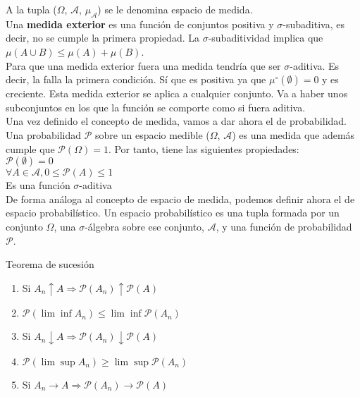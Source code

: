 A la tupla ($\Omega$, $\mathcal{A}$, $\mu_{\mathcal{A}}$) se le denomina espacio de medida.\\

Una \textbf{medida exterior} es una función de conjuntos positiva y $\sigma$-subaditiva, es decir, no se cumple la primera propiedad. La $\sigma$-subaditividad implica que $\mu(A \cup B) \leq \mu(A) + \mu(B)$.\\

Para que una medida exterior fuera una medida tendría que ser $\sigma$-aditiva. Es decir, la falla la primera condición. Sí que es positiva ya que $\mu^\circ(\emptyset)=0$ y es creciente. Esta medida exterior se aplica a cualquier conjunto. Va a haber unos subconjuntos en los que la función se comporte como si fuera aditiva.\\

Una vez definido el concepto de medida, vamos a dar ahora el de probabilidad. Una probabilidad $\mathcal{P}$ sobre un espacio medible ($\Omega$, $\mathcal{A}$) es una medida que además cumple que $\mathcal{P}(\Omega)=1$. Por tanto, tiene las siguientes propiedades:\\

$\mathcal{P}(\emptyset)=0$\\
$\forall A \in \mathcal{A}, 0 \leq \mathcal{P}(A) \leq 1$\\
Es una función $\sigma$-aditiva\\

De forma análoga al concepto de espacio de medida, podemos definir ahora el de espacio probabilístico. Un espacio probabilístico es una tupla formada por un conjunto $\Omega$, una $\sigma$-álgebra sobre ese conjunto, $\mathcal{A}$, y una función de probabilidad $\mathcal{P}$.

\begin{theorem}
Teorema de sucesión
\begin{enumerate}
\item Si $A_n \uparrow A \Rightarrow \mathcal{P} (A_n) \uparrow \mathcal{P}(A)$
\item $\mathcal{P}(\lim \inf A_n) \leq \lim \inf \mathcal{P}(A_n)$
\item Si $A_n \downarrow A \Rightarrow \mathcal{P} (A_n) \downarrow \mathcal{P}(A)$
\item $\mathcal{P}(\lim \sup A_n) \geq \lim \sup \mathcal{P}(A_n)$
\item Si $A_n \rightarrow A \Rightarrow \mathcal{P} (A_n) \rightarrow \mathcal{P}(A)$
\end{enumerate}
\end{theorem}

